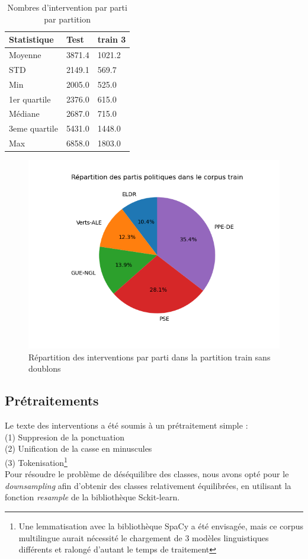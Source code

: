 \begin{table}[ht]
    \centering
\begin{tabular}{|l|l|l|}
\hline
Statistique & Test & train 3 \\ \hline
Moyenne & 3871.4 & 1021.2 \\ \hline
STD & 2149.1 & 569.7 \\ \hline
Min & 2005.0 & 525.0 \\ \hline
1er quartile & 2376.0 & 615.0 \\ \hline
Médiane & 2687.0 & 715.0\\ \hline
3eme quartile & 5431.0 & 1448.0\\ \hline
Max & 6858.0 & 1803.0\\ \hline
\end{tabular}
\caption{Nombres d'intervention par parti par partition}
\label{tab:stats_dataset}
\end{table}

\begin{figure}[ht]
    \centering
    \includegraphics[width=\columnwidth]{../stats/occurences_par_partis_train_camember.png}
    \caption{Répartition des interventions par parti dans la partition train sans doublons}
    \label{fig:camember_dataset}
\end{figure}
\subsection{Prétraitements}
Le texte des interventions a été soumis à un prétraitement simple :\\
\indent(1) Suppresion de la ponctuation\\
\indent(2) Unification de la casse en minuscules\\
\indent(3) Tokenisation\footnote {Une lemmatisation avec la bibliothèque SpaCy a été envisagée,
mais ce corpus multilingue aurait nécessité le chargement de 3 modèles linguistiques
différents et ralongé d'autant le temps de traitement}
\\
Pour résoudre le problème de déséquilibre des classes, nous avons opté pour le \textit{downsampling} afin d'obtenir des classes relativement équilibrées,
en utilisant la fonction \textit{resample} de la bibliothèque Sckit-learn.

